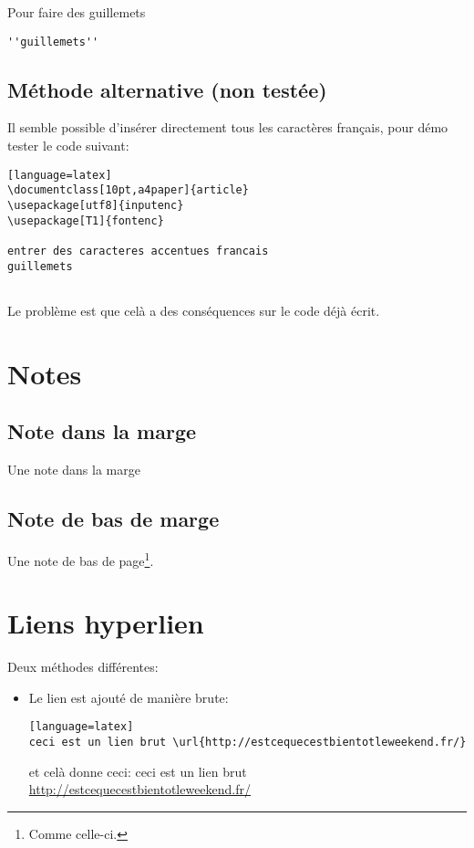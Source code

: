 Pour faire des guillemets
\begin{verbatim}
''guillemets''
\end{verbatim}


\subsection{M\'ethode alternative (non test\'ee)}

Il semble possible d'ins\'erer directement tous les caract\`eres fran\c{c}ais, pour d\'emo tester le code suivant:

\begin{lstlisting}[caption={Insertion de caract\`eres fran\c{c}ais}][language=latex]
\documentclass[10pt,a4paper]{article}
\usepackage[utf8]{inputenc}
\usepackage[T1]{fontenc}

entrer des caracteres accentues francais
guillemets


\end{lstlisting}

Le probl\`eme est que cel\`a a des cons\'equences sur le code d\'ej\`a \'ecrit.



\section{Notes}
\subsection{Note dans la marge}
Une note dans la marge
\subsection{Note de bas de marge}
Une note de bas de page\footnote{Comme celle-ci.}.



\section{Liens hyperlien}
Deux m\'ethodes diff\'erentes:

\begin{itemize}
\item Le lien est ajout\' e de mani\`ere brute:

\begin{lstlisting}[caption={Insertion de liens Internet}][language=latex]
ceci est un lien brut \url{http://estcequecestbientotleweekend.fr/}
\end{lstlisting}

et cel\`a donne ceci:\newline
ceci est un lien brut
\url{http://estcequecestbientotleweekend.fr/}\newline
\end{itemize}




